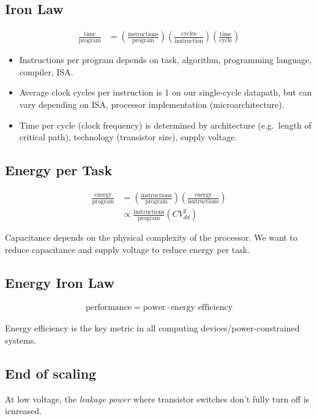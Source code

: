 \subsection{Iron Law}
\begin{align}
	\frac{\text{time}}{\text{program}} &= 
	\left(\frac{\text{instructions}}{\text{program}}\right)
	\left(\frac{\text{cycles}}{\text{instruction}}\right)
	\left(\frac{\text{time}}{\text{cycle}}\right)
\end{align}

\begin{itemize}
    \item Instructions per program depends on task, algorithm, programming language, compiler, ISA.
    \item Average clock cycles per instruction is 1 on our single-cycle datapath, but can vary depending on ISA, processor implementation (microarchitecture).
    \item Time per cycle (clock frequency) is determined by architecture (e.g.~length of critical path), technology (transistor size), supply voltage.
\end{itemize}
 
\subsection{Energy per Task}
\begin{align}
\frac{\text{energy}}{\text{program}}
&= \left(\frac{\text{instructions}}{\text{program}}\right)
\left(\frac{\text{energy}}{\text{isntructions}}\right)\\
& \propto \frac{\text{instructions}}{\text{program}}
\left(CV_{dd}^2\right)
\end{align}

Capacitance depends on the physical complexity of the processor. We want to reduce capacitance and supply voltage to reduce energy per task.

\subsection{Energy Iron Law}
\begin{align}
    \text{performance} = \text{power} \cdot \text{energy efficiency}
\end{align}

Energy efficiency is the key metric in all computing devices/power-constrained systems.

\subsection{End of scaling}
At low voltage, the \emph{leakage power} where transistor switches don't fully turn off is icnreased.